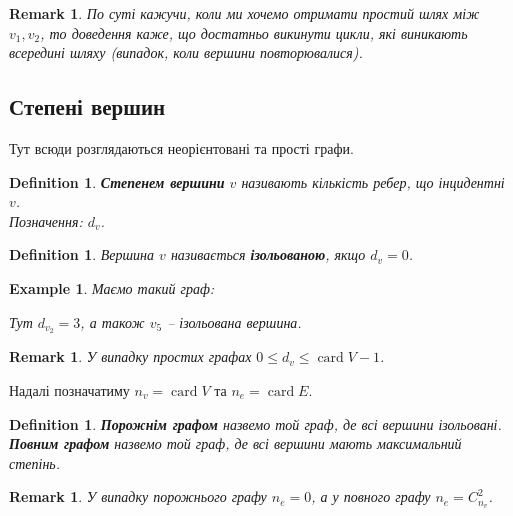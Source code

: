 \documentclass[a4paper, 14pt]{extarticle}
\theoremstyle{theoremdd}
\theoremstyle{theoremdd}
\newtheorem{definition}[theorem]{Definition}
\theoremstyle{theoremdd}
\theoremstyle{theoremdd}
\theoremstyle{theoremdd}
\newtheorem{example}[theorem]{Example}
\theoremstyle{theoremdd}
\theoremstyle{theoremdd}
\theoremstyle{theoremdd}
\theoremstyle{theoremdd}
\theoremstyle{theoremdd}
\theoremstyle{theoremdd}
\newtheorem{remark}[theorem]{Remark}
\theoremstyle{theoremdd}
\theoremstyle{theoremdd}
\theoremstyle{theoremdd}
\theoremstyle{theoremdd}
\DeclareMathOperator{\card}{card}
\begin{document}
\begin{remark}
По суті кажучи, коли ми хочемо отримати простий шлях між $v_1,v_2$, то доведення каже, що достатньо викинути цикли, які виникають всередині шляху (випадок, коли вершини повторювалися).
\end{remark}

\subsection{Степені вершин}
Тут всюди розглядаються неорієнтовані та прості графи.

\begin{definition}
\textbf{Степенем вершини} $v$ називають кількість ребер, що інцидентні $v$.\\
Позначення: $d_v$.
\end{definition}

\begin{definition}
Вершина $v$ називається \textbf{ізольованою}, якщо $d_v = 0$.
\end{definition}

\begin{example}
Маємо такий граф:
\begin{figure}[H]
\centering
{}
\end{figure}
Тут $d_{v_2} = 3$, а також $v_5$ -- ізольована вершина.
\end{example}

\begin{remark}
У випадку простих графах $0 \leq d_v \leq \card V -1$.
\end{remark}

Надалі позначатиму $n_v = \card V$ та $n_e = \card E$.

\begin{definition}
\textbf{Порожнім графом} назвемо той граф, де всі вершини ізольовані. \textbf{Повним графом} назвемо той граф, де всі вершини мають максимальний степінь.
\end{definition}

\begin{remark}
У випадку порожнього графу $n_e= 0$, а у повного графу $n_e = C_{n_v}^2$.
\end{remark}
\end{document}
